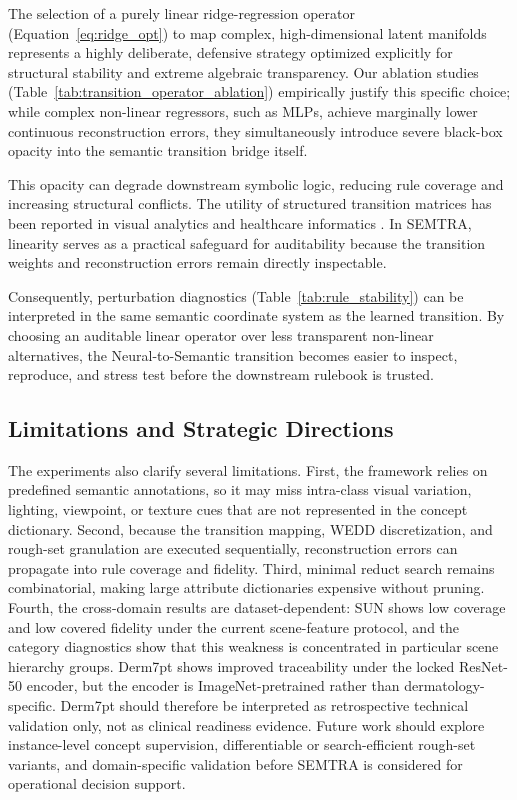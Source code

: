 \documentclass[make,article,submit,pdftex,moreauthors]{Definitions/mdpi}
\begin{document}
The selection of a purely linear ridge-regression operator (Equation~\eqref{eq:ridge_opt}) to map complex, high-dimensional latent manifolds represents a highly deliberate, defensive strategy optimized explicitly for structural stability and extreme algebraic transparency. Our ablation studies (Table~\ref{tab:transition_operator_ablation}) empirically justify this specific choice; while complex non-linear regressors, such as MLPs, achieve marginally lower continuous reconstruction errors, they simultaneously introduce severe black-box opacity into the semantic transition bridge itself. 

This opacity can degrade downstream symbolic logic, reducing rule coverage and increasing structural conflicts. The utility of structured transition matrices has been reported in visual analytics \cite{Radiuk2024TransitionMatrix} and healthcare informatics \cite{Barmak2024TowardTransition}. In SEMTRA, linearity serves as a practical safeguard for auditability because the transition weights and reconstruction errors remain directly inspectable.

Consequently, perturbation diagnostics (Table~\ref{tab:rule_stability}) can be interpreted in the same semantic coordinate system as the learned transition. By choosing an auditable linear operator over less transparent non-linear alternatives, the Neural-to-Semantic transition becomes easier to inspect, reproduce, and stress test before the downstream rulebook is trusted.

\subsection{Limitations and Strategic Directions}
\label{subsec:limitations_directions}

The experiments also clarify several limitations. First, the framework relies on predefined semantic annotations, so it may miss intra-class visual variation, lighting, viewpoint, or texture cues that are not represented in the concept dictionary. Second, because the transition mapping, WEDD discretization, and rough-set granulation are executed sequentially, reconstruction errors can propagate into rule coverage and fidelity. Third, minimal reduct search remains combinatorial, making large attribute dictionaries expensive without pruning. Fourth, the cross-domain results are dataset-dependent: SUN shows low coverage and low covered fidelity under the current scene-feature protocol, and the category diagnostics show that this weakness is concentrated in particular scene hierarchy groups. Derm7pt shows improved traceability under the locked ResNet-50 encoder, but the encoder is ImageNet-pretrained rather than dermatology-specific. Derm7pt should therefore be interpreted as retrospective technical validation only, not as clinical readiness evidence. Future work should explore instance-level concept supervision, differentiable or search-efficient rough-set variants, and domain-specific validation before SEMTRA is considered for operational decision support.
\end{document}
